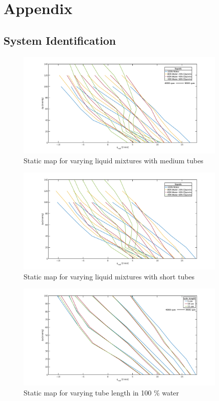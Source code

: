 \chapter{Appendix}
\section{System Identification}
\begin{figure}[ht]
  \includegraphics[width=0.9\textwidth]{images/plots_syst_ident/medium_liquid_change.pdf}
  \caption[Static map for varying liquid mixtures with medium tubes]{Static map for varying liquid mixtures with medium tubes}
\end{figure}

\begin{figure}[ht]
  \includegraphics[width=0.9\textwidth]{images/plots_syst_ident/short_liquid_change.pdf}
  \caption[Static map for varying liquid mixtures with short tubes]{Static map for varying liquid mixtures with short tubes}
\end{figure}

\begin{figure}[ht]
  \includegraphics[width=0.9\textwidth]{images/plots_syst_ident/100w_tube_length.pdf}
  \caption[Static map for different tube length in 100 \% water]{Static map for varying tube length in 100 \% water}
\end{figure}

